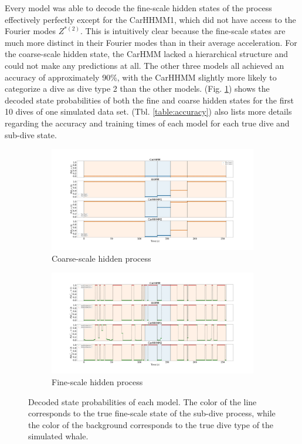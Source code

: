 Every model was able to decode the fine-scale hidden states of the process effectively perfectly except for the CarHHMM1, which did not have access to the Fourier modes $Z^{*(2)}$. This is intuitively clear because the fine-scale states are much more distinct in their Fourier modes than in their average acceleration. For the coarse-scale hidden state, the CarHMM lacked a hierarchical structure and could not make any predictions at all. The other three models all achieved an accuracy of approximately 90\%, with the CarHHMM slightly more likely to categorize a dive as dive type 2 than the other models. (Fig. \ref{fig:acc}) shows the decoded state probabilities of both the fine and coarse hidden states for the first 10 dives of one simulated data set. (Tbl. \ref{table:accuracy}) also lists more details regarding the accuracy and training times of each model for each true dive and sub-dive state.

\begin{figure}[ht]
    \centering
    \begin{subfigure}[t]{1.0\textwidth}
        \centering
        \includegraphics[width=5in]{Plots/Posterior_Coarse_States.png}
        \caption{Coarse-scale hidden process}
    \end{subfigure}
    \newline
    \begin{subfigure}[t]{1.0\textwidth}
        \centering
        \includegraphics[width=5in]{Plots/Posterior_Fine_States.png}
        \caption{Fine-scale hidden process}
    \end{subfigure}
	\caption{Decoded state probabilities of each model. The color of the line corresponds to the true fine-scale state of the sub-dive process, while the color of the background corresponds to the true dive type of the simulated whale.}
	\label{fig:acc}
\end{figure}


